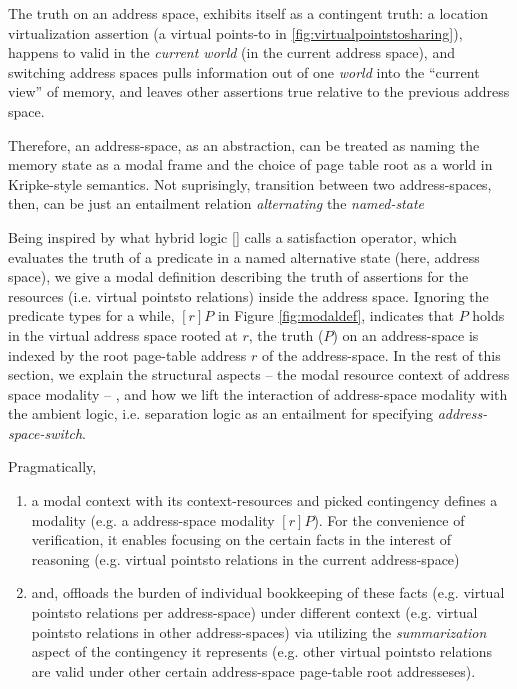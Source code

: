 \begin{remark}
  \label{remark:pattern}
The truth on an address space, exhibits itself as a contingent truth: a location virtualization assertion (a virtual points-to in \ref{fig:virtualpointstosharing}),  happens to valid in the \textit{current world} (in the current address space), and switching address spaces pulls information out of one \textit{world} into the “current view” of memory, and leaves other assertions true relative to the previous address space.

Therefore, an address-space, as an abstraction, can be treated as naming the memory state as a modal frame and the choice of page table root as a world in Kripke-style semantics. Not suprisingly, transition between two address-spaces, then, can be just an entailment relation \textit{alternating} the \textit{named-state}

Being inspired by what hybrid logic \ref{} calls a satisfaction operator, which evaluates the truth of a predicate in a named alternative state (here, address space), we give a modal definition describing the truth of assertions for the resources (i.e. virtual pointsto relations) inside the address space. Ignoring the predicate types for a while, $[r]P$ in Figure \ref{fig:modaldef}, indicates that $P$ holds in the virtual address space rooted at $r$, the truth ($P$) on an address-space is indexed by the root page-table address $r$ of the address-space. In the rest of this section, we explain the structural aspects -- the modal resource context of address space modality -- , and how we lift the interaction of address-space modality with the ambient logic, i.e. separation logic as an entailment for specifying \textit{address-space-switch}.

Pragmatically, 
  \begin{enumerate}
  \item a modal context with its context-resources and picked contingency defines a modality (e.g. a address-space modality $[r]P$). For the convenience of verification, it enables focusing on the certain facts in the interest of reasoning (e.g. virtual pointsto relations in the current address-space)
  \item and, offloads the burden of individual bookkeeping of these facts (e.g. virtual pointsto relations per address-space) under different context (e.g. virtual pointsto relations in other address-spaces) via utilizing the \textit{summarization} aspect of the contingency it represents (e.g. other virtual pointsto relations are valid under other certain address-space page-table root addresseses).  
  \end{enumerate}
\end{remark}

